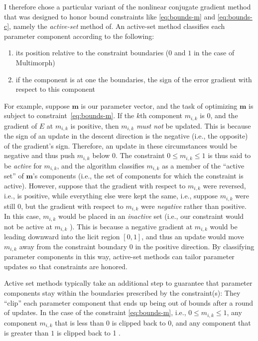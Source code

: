 I therefore chose a particular variant of the nonlinear conjugate gradient method that was designed to honor bound constraints like \eqref{eq:bounds-m} and \eqref{eq:bounds-c}, namely the \emph{active-set} method of\citet{cheng-and-li:2012}. 
An active-set method classifies
each parameter component according to the following:
\begin{enumerate}
\item its position relative to the constraint boundaries ($0$ and $1$ in the case of Multimorph)
\item if the component is at one the boundaries, the sign of the error gradient with respect to this component
\end{enumerate}
For example, suppose $\textbf{m}$ is our parameter vector, and the task of optimizing $\textbf{m}$ is
subject to constraint~\ref{eq:bounds-m}. If the $k$th component $m_{i,k}$ is $0$, and the gradient of $E$ 
at $m_{i,k}$ is positive, then $m_{i,k}$ \emph{must not} be updated. This is
because the sign of an update in the descent direction is the negative (i.e., the opposite) of the gradient's sign. Therefore,
an update in these circumstances would be negative and thus push $m_{i,k}$ below $0$.
The constraint $0 \leq m_{i,k }\leq 1$ is thus said to be
\emph{active} 
for $m_{i,k}$, and the algorithm classifies $m_{i,k}$ as a member of the ``active set'' of 
$\textbf{m}$'s components (i.e., the set of components for which the constraint is active).
However, suppose that the gradient with respect to $m_{i,k}$ were reversed, i.e., is positive, while everything else were kept the same, i.e., suppose 
$m_{i,k}$ were still $0$, but the gradient with respect to $m_{i,k}$ were \emph{negative} 
rather than positive. 
In this case, $m_{i,k}$ would be placed in an \emph{inactive} set (i.e., our constraint 
would not be active at $m_{i,k}$ ). This is because a negative
gradient at $m_{i,k}$ would be leading downward into the licit region $[0,1]$, and 
thus an update would move $m_{i,k}$ away from the constraint boundary $0$ in the 
positive direction. 
By classifying 
parameter components in this way, active-set methods can tailor parameter updates 
so that constraints are honored. 

Active set methods typically take an 
additional step to guarantee that parameter components stay within the boundaries 
prescribed by the constraint(s): They ``clip'' each parameter component that ends up being out 
of bounds after a round of updates. In the case of the constraint \eqref{eq:bounds-m}, i.e., $0 \leq m_{i,k} \leq 1$,
any component $m_{i,k}$ that is less than $0$ is clipped back to $0$, and any component that is greater 
than $1$ is clipped back to 1 \citep{ni:yuan:1997}.

